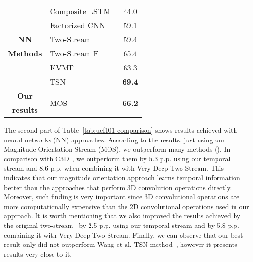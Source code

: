 \documentclass[10pt,conference]{IEEEtran}
\begin{document}
\begin{table}[!htb]
\begin{small}
\begin{tabular}{clc}
			& Composite LSTM~\cite{Srivastava:2015}  & \multicolumn{1}{c}{44.0} \\
			& Factorized CNN~\cite{Sun:2015} & \multicolumn{1}{c}{59.1} \\
			\multirow{1}{*}{\textbf{NN}} & Two-Stream~\cite{Simonyan:2014}  & \multicolumn{1}{c}{59.4} \\ 
			\multirow{1}{*}{\textbf{Methods}} & Two-Stream F~\cite{Feichtenhofer:2016}  & \multicolumn{1}{c}{65.4} \\
			& KVMF~\cite{Zhu:2016} & \multicolumn{1}{c}{63.3} \\
			& TSN~\cite{Wang:2016} & \multicolumn{1}{c}{\textbf{69.4}} \\
			\midrule
			\multirow{1}{*}{\textbf{Our}} &\multirow{2}{*}{MOS} & \multicolumn{1}{c}{\multirow{2}{*}{\textbf{66.2}}} \\
			\multirow{1}{*}{\textbf{results}} & & \\
			\bottomrule
		\end{tabular}
		\label{tab:hmdb51-comparison}
	\end{small}
\end{table}

The second part of Table~\ref{tab:ucf101-comparison} shows results achieved with neural networks (NN) approaches. 
According to the results, just using our Magnitude-Orientation Stream (MOS), we outperform many methods (\cite{Karpathy:2014, Srivastava:2015, Tran:2015, Sun:2015, Simonyan:2014}). In comparison with C3D~\cite{Tran:2015}, we outperform them by 5.3 p.p. using our temporal stream and 8.6 p.p. when combining it with Very Deep Two-Stream. This indicates that our magnitude orientation approach learns temporal information better than the approaches that perform 3D convolution operations directly. Moreover, such finding is very important since 3D convolutional operations are more computationally expensive than the 2D convolutional operations used in our approach. %
It is worth mentioning that we also improved the results achieved by the original two-stream~\cite{Simonyan:2014} by 2.5 p.p. using our temporal stream and by 5.8 p.p. combining it with Very Deep Two-Stream. Finally, we can observe that our best result only did not outperform Wang et al. TSN method~\cite{Wang:2016}, however it presents results very close to it.

\end{document}
